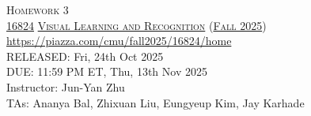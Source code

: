 \documentclass[11pt,addpoints,answers]{exam}
\title{\textsc{\hwName}} %
\author{}
\date{}
\date{}
\numberwithin{equation}{section} %
\numberwithin{figure}{section} %
\numberwithin{table}{section} %
\newcommand{\courseNum}{\href{https://visual-learning.cs.cmu.edu/}{16824}}
\newcommand{\courseName}{\href{https://visual-learning.cs.cmu.edu/}{Visual Learning and Recognition}}
\newcommand{\courseSem}{\href{https://visual-learning.cs.cmu.edu/}{Fall 2025}}
\newcommand{\courseUrl}{\url{https://piazza.com/cmu/fall2025/16824/home}}
\newcommand{\hwNum}{Homework 3}
\newcommand{\hwTopic}{Transformers}
\newcommand{\outDate}{Fri, 24th Oct 2025}
\newcommand{\dueDate}{11:59 PM ET, Thu, 13th Nov 2025}
\newcommand{\instructorName}{Jun-Yan Zhu}
\newcommand{\taNames}{Ananya Bal, Zhixuan Liu, Eungyeup Kim, Jay Karhade}
\begin{document}
\section*{}
\begin{center}
  \textsc{\LARGE \hwNum} \\
  \vspace{1em}
  \textsc{\large \courseNum{} \courseName{} (\courseSem)} \\
  \courseUrl\\
  \vspace{1em}
  RELEASED: \outDate \\
  DUE: \dueDate \\
  Instructor: \instructorName \\
  TAs: \taNames
\end{center}
\end{document}

